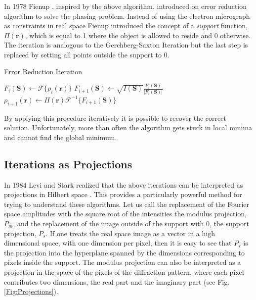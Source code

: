 In 1978 Fienup \cite{Fienup1978Reconstruction}, inspired by the above algorithm, introduced on error
reduction algorithm to solve the phasing problem. Instead of using the electron
micrograph as constraints in real space Fienup introduced the concept of a {\em
  support} function, $\Pi(\mathbf r)$, which is equal to 1 where the
object is allowed to reside and 0 otherwise. 
The iteration is analogous to the Gerchberg-Saxton Iteration but the last step is replaced
by setting all points outside the support to 0.
\begin{algorithm}
\caption{Error Reduction Iteration}
\begin{algorithmic}
  \STATE $F_{i}(\mathbf S) \gets \mathscr{F}\{\rho_i(\mathbf r)\}$
  \STATE $F_{i+1}(\mathbf S) \gets \sqrt{I(\mathbf S)} \frac{F_i(\mathbf S)}{|F_i(\mathbf S)|}$
  \STATE $\rho_{i+1}(\mathbf r) \gets \Pi(\mathbf r) \mathscr{F}^{-1}\{F_{i+1}(\mathbf S)\}$
\end{algorithmic}
\end{algorithm}

By applying this procedure iteratively it is possible to recover the correct
solution. 
Unfortunately, 
more than often 
 the algorithm
 gets stuck in
local minima and cannot find the global minimum.

\subsection{Iterations as Projections}

In 1984 Levi and Stark realized that the above iterations can be
interpreted as projections in Hilbert space \cite{Levi1984Image}. This provides a
particularly powerful method for trying to understand these algorithms.
Let us call the replacement of the Fourier space amplitudes with the square root of
the intensities the modulus projection, $P_m$, and the replacement of the image
outside of the support with 0, the support projection, $P_s$. If one treats the
real space image as a vector in a high dimensional space, with one dimension per
pixel, then it is easy to see that $P_s$ is the projection into the hyperplane
spanned by the dimensions corresponding to pixels inside the support. The
modulus projection can also be interpreted as a projection in the space of the
pixels of the diffraction pattern, where each pixel contributes two dimensions,
the real part and the imaginary part (see Fig. \ref{Fig:Projections}). 

